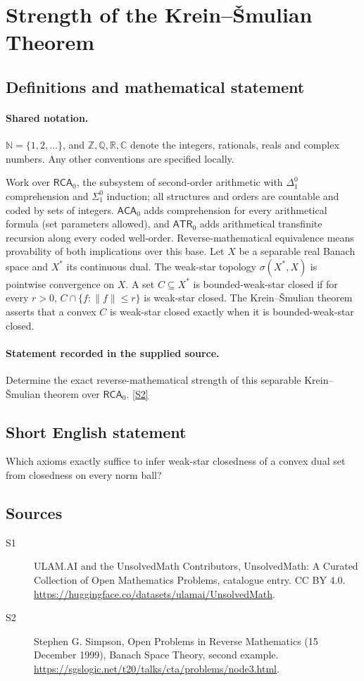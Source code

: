 \documentclass[11pt]{article}
\newcommand{\sref}[2]{\hyperlink{source:#1:#2}{[S#2]}}
\begin{document}
\section{Strength of the Krein–Šmulian Theorem}\label{statement}

\subsection{Definitions and mathematical statement}

\paragraph{Shared notation.}$\mathbb N=\{1,2,\ldots\}$, and $\mathbb Z,\mathbb Q,\mathbb R,\mathbb C$ denote the integers, rationals, reals and complex numbers. Any other conventions are specified locally.


Work over $\mathsf{RCA}_0$, the subsystem of second-order arithmetic with $\Delta^0_1$ comprehension and $\Sigma^0_1$ induction; all structures and orders are countable and coded by sets of integers. $\mathsf{ACA}_0$ adds comprehension for every arithmetical formula (set parameters allowed), and $\mathsf{ATR}_0$ adds arithmetical transfinite recursion along every coded well-order. Reverse-mathematical equivalence means provability of both implications over this base. Let $X$ be a separable real Banach space and $X^*$ its continuous dual. The weak-star topology $\sigma(X^*,X)$ is pointwise convergence on $X$. A set $C\subseteq X^*$ is bounded-weak-star closed if for every $r>0$, $C\cap\{f:\|f\|\le r\}$ is weak-star closed. The Krein--\v Smulian theorem asserts that a convex $C$ is weak-star closed exactly when it is bounded-weak-star closed.
\paragraph{Statement recorded in the supplied source.}
Determine the exact reverse-mathematical strength of this separable Krein--\v Smulian theorem over $\mathsf{RCA}_0$. \sref{statement}{2}
\subsection{Short English statement}
Which axioms exactly suffice to infer weak-star closedness of a convex dual set from closedness on every norm ball?
\subsection{Sources}
\begin{description}
\item[\hypertarget{source:statement:1}{S1}] ULAM.AI and the UnsolvedMath Contributors, UnsolvedMath: A Curated Collection of Open Mathematics Problems, catalogue entry. CC BY 4.0. \url{https://huggingface.co/datasets/ulamai/UnsolvedMath}.
\item[\hypertarget{source:statement:2}{S2}] Stephen G. Simpson, Open Problems in Reverse Mathematics (15 December 1999), Banach Space Theory, second example. \url{https://sgslogic.net/t20/talks/cta/problems/node3.html}.
\end{description}
\label{end:statement}
\end{document}
